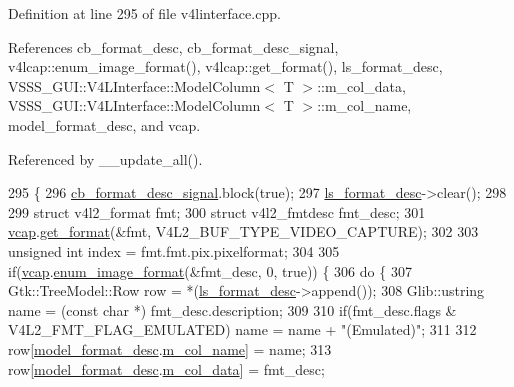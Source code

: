 Definition at line 295 of file v4linterface.\+cpp.



References cb\+\_\+format\+\_\+desc, cb\+\_\+format\+\_\+desc\+\_\+signal, v4lcap\+::enum\+\_\+image\+\_\+format(), v4lcap\+::get\+\_\+format(), ls\+\_\+format\+\_\+desc, V\+S\+S\+S\+\_\+\+G\+U\+I\+::\+V4\+L\+Interface\+::\+Model\+Column$<$ T $>$\+::m\+\_\+col\+\_\+data, V\+S\+S\+S\+\_\+\+G\+U\+I\+::\+V4\+L\+Interface\+::\+Model\+Column$<$ T $>$\+::m\+\_\+col\+\_\+name, model\+\_\+format\+\_\+desc, and vcap.



Referenced by \+\_\+\+\_\+update\+\_\+all().


\begin{DoxyCode}
295                                                \{
296         \hyperlink{class_v_s_s_s___g_u_i_1_1_v4_l_interface_a01fe3a5a8d0f0bfa6bb19cdcb138b38d}{cb\_format\_desc\_signal}.block(\textcolor{keyword}{true});
297         \hyperlink{class_v_s_s_s___g_u_i_1_1_v4_l_interface_af84894601f7c0cc60854344efdb38558}{ls\_format\_desc}->clear();
298 
299         \textcolor{keyword}{struct }v4l2\_format fmt;
300         \textcolor{keyword}{struct }v4l2\_fmtdesc fmt\_desc;
301         \hyperlink{class_v_s_s_s___g_u_i_1_1_v4_l_interface_a7ece61f4ccc6d5321c445e60f34e7f33}{vcap}.\hyperlink{classv4lcap_aa5c521438e06e14625c05a02bafd35c1}{get\_format}(&fmt, V4L2\_BUF\_TYPE\_VIDEO\_CAPTURE);
302 
303         \textcolor{keywordtype}{unsigned} \textcolor{keywordtype}{int} index = fmt.fmt.pix.pixelformat;
304 
305         \textcolor{keywordflow}{if}(\hyperlink{class_v_s_s_s___g_u_i_1_1_v4_l_interface_a7ece61f4ccc6d5321c445e60f34e7f33}{vcap}.\hyperlink{classv4lcap_a4f5a8ccdd2a75e9d2f2d4d541fdb84dd}{enum\_image\_format}(&fmt\_desc, 0, \textcolor{keyword}{true})) \{
306             \textcolor{keywordflow}{do} \{
307                 Gtk::TreeModel::Row row = *(\hyperlink{class_v_s_s_s___g_u_i_1_1_v4_l_interface_af84894601f7c0cc60854344efdb38558}{ls\_format\_desc}->append());
308                 Glib::ustring name = (\textcolor{keyword}{const} \textcolor{keywordtype}{char} *) fmt\_desc.description;
309 
310                 \textcolor{keywordflow}{if}(fmt\_desc.flags & V4L2\_FMT\_FLAG\_EMULATED) name = name + \textcolor{stringliteral}{"(Emulated)"};
311 
312                 row[\hyperlink{class_v_s_s_s___g_u_i_1_1_v4_l_interface_abd94aec4d6c691967cee26950e179fd1}{model\_format\_desc}.\hyperlink{class_v_s_s_s___g_u_i_1_1_v4_l_interface_1_1_model_column_a96d5f652d19a139a1380d9ffc0110ed0}{m\_col\_name}] = name;
313                 row[\hyperlink{class_v_s_s_s___g_u_i_1_1_v4_l_interface_abd94aec4d6c691967cee26950e179fd1}{model\_format\_desc}.\hyperlink{class_v_s_s_s___g_u_i_1_1_v4_l_interface_1_1_model_column_aa6720e1b3e47adb85d36c3ec3a2bb262}{m\_col\_data}] = fmt\_desc;

\end{DoxyCode}
